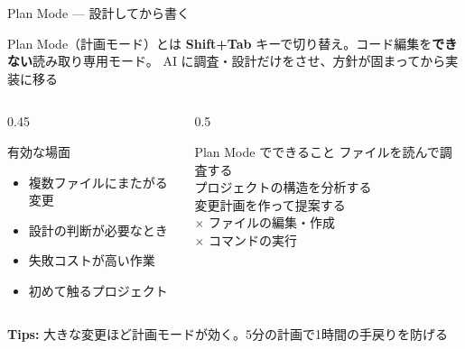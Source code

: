 \documentclass[aspectratio=169, 14pt]{beamer}
\newcommand{\warn}[1]{\textcolor{sfred}{\textbf{#1}}}
\begin{document}
\begin{frame}{Plan Mode — 設計してから書く}
  \begin{block}{Plan Mode（計画モード）とは}
    {\small \textbf{Shift+Tab} キーで切り替え。コード編集を\textbf{できない}読み取り専用モード。
    AI に調査・設計だけをさせ、方針が固まってから実装に移る}
  \end{block}

  \begin{columns}[T]
    \begin{column}{0.45\textwidth}
      \begin{alertblock}{有効な場面}
        \begin{itemize}\footnotesize
          \item 複数ファイルにまたがる変更
          \item 設計の判断が必要なとき
          \item 失敗コストが高い作業
          \item 初めて触るプロジェクト
        \end{itemize}
      \end{alertblock}
    \end{column}
    \begin{column}{0.5\textwidth}
      \begin{exampleblock}{Plan Mode でできること}
        {\footnotesize
        ファイルを読んで調査する \\
        プロジェクトの構造を分析する \\
        変更計画を作って提案する \\[3pt]
        \warn{$\times$} ファイルの編集・作成 \\
        \warn{$\times$} コマンドの実行
        }
      \end{exampleblock}
    \end{column}
  \end{columns}

  {\scriptsize \textbf{Tips:} 大きな変更ほど計画モードが効く。5分の計画で1時間の手戻りを防げる}
\end{frame}
\end{document}
